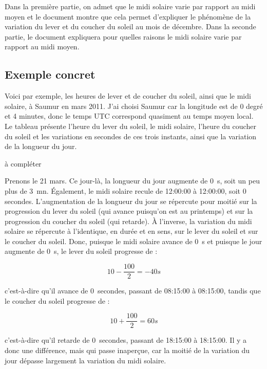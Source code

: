 \documentclass[a4paper]{article}
\newenvironment{texte}{\rmfamily}{}
\newcommand{\matable}{à compléter}
\newcommand{\veilaubehhmmss}[0]{08:15:00}
\newcommand{\veilmidihhmmss}[0]{12:00:00}
\newcommand{\veilsoirhhmmss}[0]{18:15:00}
\newcommand{\jouraubehhmmss}[0]{08:15:00}
\newcommand{\jourmidihhmmss}[0]{12:00:00}
\newcommand{\joursoirhhmmss}[0]{18:15:00}
\newcommand{\deltalumi}[0]{0}
\newcommand{\deltaaube}[0]{0}
\newcommand{\deltamidi}[0]{0}
\newcommand{\deltasoir}[0]{0}
\newcommand{\formuleaube}[0]{\[ 10 - \frac{100}{2} = -40 s \]}
\newcommand{\formulesoir}[0]{\[ 10 + \frac{100}{2} = 60 s \]}
\begin{document}
\begin{texte}
Dans la première partie, on admet que le midi solaire varie par rapport
au midi moyen et le document montre que cela permet d'expliquer le phénomène
de la variation du lever et du coucher du soleil au mois de décembre.
Dans la seconde partie, le document expliquera pour quelles
raisons le midi solaire varie par rapport au midi moyen.

\subsection{Exemple concret}

Voici par exemple, les heures de lever et de coucher du soleil, ainsi
que le midi solaire, à Saumur en mars 2011. J'ai choisi Saumur car la
longitude est de 0 degré et 4 minutes, donc le temps UTC correspond
quasiment au temps moyen local. Le tableau présente l'heure du lever
du soleil, le midi solaire, l'heure du coucher du soleil et les variations
en secondes de ces trois instants, ainsi que la variation de la longueur
du jour.

\vspace{2mm}
\matable
\vspace{2mm}

Prenons le 21 mars. Ce jour-là, la longueur du jour augmente de \deltalumi~s,
soit un peu plus de 3~mn. Également, le midi solaire recule de
\veilmidihhmmss{} à \jourmidihhmmss{}, soit \deltamidi{} secondes.
L'augmentation de la longueur du jour se répercute pour
moitié sur la progression du lever du soleil (qui avance puisqu'on est
au printemps) et sur la progression du coucher du soleil (qui retarde).
À l'inverse, la variation du midi solaire se répercute à l'identique,
en durée et en sens, sur le lever du soleil et sur le coucher du
soleil. Donc, puisque le midi solaire avance de \deltamidi~s et puisque
le jour augmente de \deltalumi~s, le lever du soleil progresse de :

\formuleaube{}

c'est-à-dire qu'il avance de \deltaaube~secondes,
passant de \veilaubehhmmss{} à \jouraubehhmmss,
tandis que le coucher du soleil progresse de :

\formulesoir{}

c'est-à-dire qu'il retarde de \deltasoir~secondes, passant de \veilsoirhhmmss{} à
\joursoirhhmmss. Il y a donc une différence, mais qui passe inaperçue, car la
moitié de la variation du jour dépasse largement la variation du midi
solaire.

\vspace{5mm}


\end{texte}
\end{document}
